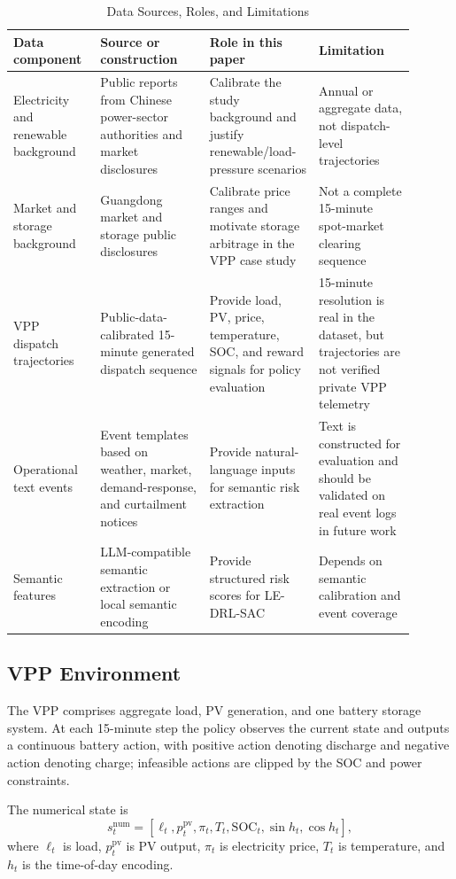 \documentclass{ieeeaccess}
\begin{document}
\begin{table}[t!]
\caption{Data Sources, Roles, and Limitations}
\label{tab:data_boundary}
\centering
\begin{tabular}{p{0.18\linewidth}p{0.25\linewidth}p{0.25\linewidth}p{0.22\linewidth}}
\toprule
\textbf{Data component} & \textbf{Source or construction} & \textbf{Role in this paper} & \textbf{Limitation} \\
\midrule
Electricity and renewable background & Public reports from Chinese power-sector authorities and market disclosures & Calibrate the study background and justify renewable/load-pressure scenarios & Annual or aggregate data, not dispatch-level trajectories \\
Market and storage background & Guangdong market and storage public disclosures & Calibrate price ranges and motivate storage arbitrage in the VPP case study & Not a complete 15-minute spot-market clearing sequence \\
VPP dispatch trajectories & Public-data-calibrated 15-minute generated dispatch sequence & Provide load, PV, price, temperature, SOC, and reward signals for policy evaluation & 15-minute resolution is real in the dataset, but trajectories are not verified private VPP telemetry \\
Operational text events & Event templates based on weather, market, demand-response, and curtailment notices & Provide natural-language inputs for semantic risk extraction & Text is constructed for evaluation and should be validated on real event logs in future work \\
Semantic features & LLM-compatible semantic extraction or local semantic encoding & Provide structured risk scores for LE-DRL-SAC & Depends on semantic calibration and event coverage \\
\bottomrule
\end{tabular}
\end{table}

\subsection{VPP Environment}
The VPP comprises aggregate load, PV generation, and one battery storage system. At each 15-minute step the policy observes the current state and outputs a continuous battery action, with positive action denoting discharge and negative action denoting charge; infeasible actions are clipped by the SOC and power constraints.

The numerical state is
\begin{equation}
s^{\mathrm{num}}_t =
[\ell_t, p^{\mathrm{pv}}_t, \pi_t, T_t, \mathrm{SOC}_t,
\sin h_t, \cos h_t],
\end{equation}
where $\ell_t$ is load, $p^{\mathrm{pv}}_t$ is PV output, $\pi_t$ is electricity price, $T_t$ is temperature, and $h_t$ is the time-of-day encoding.
\end{document}
